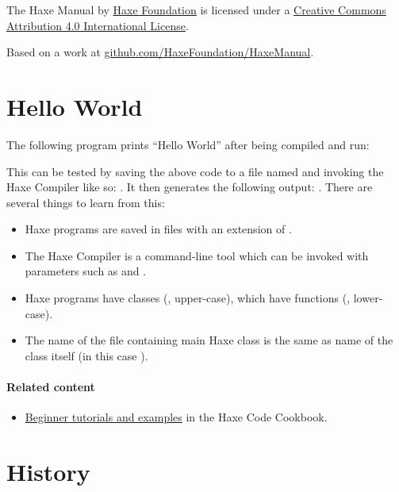 The Haxe Manual by \href{http://haxe.org/foundation}{Haxe Foundation} is licensed under a \href{http://creativecommons.org/licenses/by/4.0/}{Creative Commons Attribution 4.0 International License}.

Based on a work at \href{https://github.com/HaxeFoundation/HaxeManual}{github.com/HaxeFoundation/HaxeManual}.

\section{Hello World}
\label{introduction-hello-world}

The following program prints ``Hello World'' after being compiled and run:

This can be tested by saving the above code to a file named  and invoking the Haxe Compiler like so: . It then generates the following output: . There are several things to learn from this:

\begin{itemize}
	\item Haxe programs are saved in files with an extension of .
	\item The Haxe Compiler is a command-line tool which can be invoked with parameters such as  and .
	\item Haxe programs have classes (, upper-case), which have functions (, lower-case). 
	\item The name of the file containing main Haxe class is the same as name of the class itself (in this case ). 
\end{itemize}

\paragraph{Related content}
\begin{itemize}
	\item \href{http://code.haxe.org/category/beginner/}{Beginner tutorials and examples} in the Haxe Code Cookbook.
\end{itemize}

\section{History}
\label{introduction-haxe-history}

